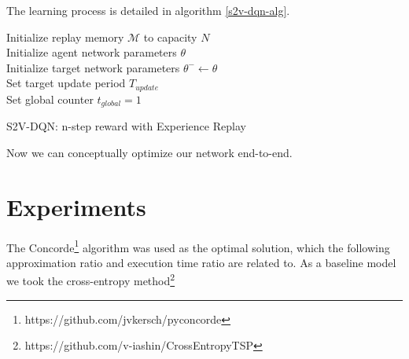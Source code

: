 \documentclass[10pt,a4paper,draft]{article}
\begin{document}
The learning process is detailed in algorithm \eqref{s2v-dqn-alg}.


\begin{algorithm}[H]
	\SetAlgoLined
	\DontPrintSemicolon
	\KwResult{$\theta$}
 	Initialize replay memory $\mathcal{M}$ to capacity $N$ \\
	Initialize agent network parameters $\theta$ \\
	Initialize target network parameters $\theta^- \leftarrow \theta$ \\
	Set target update period $T_{update}$ \\ 
	Set global counter $t_{global} = 1$ \\
	\caption{S2V-DQN: n-step reward with Experience Replay}
 	\label{s2v-dqn-alg}
\end{algorithm}

Now we can conceptually optimize our network end-to-end.

\section{Experiments}
	The Concorde\footnote{https://github.com/jvkersch/pyconcorde} algorithm was used as the optimal solution, which the following approximation ratio and execution time ratio are related to. As a baseline model we took the cross-entropy method\footnote{https://github.com/v-iashin/CrossEntropyTSP}
\end{document}
